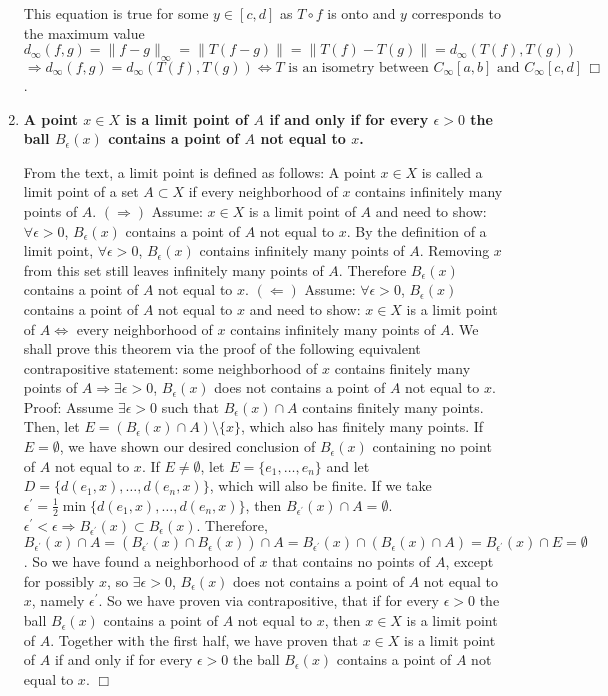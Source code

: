 \documentclass[12pt,letterpaper,reqno]{amsart}
\begin{document}
\begin{enumerate}[1.]
\begin{flushleft}
    This equation is true for some $y \in [c,d]$ as $T\circ f$ is onto and $y$ corresponds to the maximum value
    $$ d_\infty(f,g) = \|f-g\|_\infty = \|T(f-g)\| = \|T(f) - T(g)\| = d_\infty(T(f),T(g)) $$
    $$ \Rightarrow d_\infty(f,g) = d_\infty(T(f),T(g)) \Leftrightarrow T \text{ is an isometry between } C_\infty[a,b] \text{ and } C_\infty[c,d] \, \Box$$. 
\end{flushleft}
\item \textbf{A point $x\in X$ is a limit point of $A$ if and only if for every $\epsilon>0$ the ball $B_\epsilon(x)$ contains a point of $A$ not equal to $x$.}
\begin{flushleft}
    From the text, a limit point is defined as follows:  A point $x \in X$ is called a limit point of a set $A \subset X$ if every neighborhood of $x$ contains infinitely many points of $A$. \newline $(\Rightarrow)$ Assume: $x \in X$ is a limit point of $A$ and need to show: $\forall \epsilon > 0$, $B_\epsilon(x)$ contains a point of $A$ not equal to $x$. By the definition of a limit point, $\forall \epsilon > 0$, $B_\epsilon(x)$ contains infinitely many points of $A$. Removing $x$ from this set still leaves infinitely many points of $A$. Therefore $B_\epsilon(x)$ contains a point of $A$ not equal to $x$.
    \newline $(\Leftarrow)$ Assume: $\forall \epsilon > 0$, $B_\epsilon(x)$ contains a point of $A$ not equal to $x$ and need to show: $x \in X$ is a limit point of $A \Leftrightarrow$ every neighborhood of $x$ contains infinitely many points of $A$. We shall prove this theorem via the proof of the following equivalent contrapositive statement: some neighborhood of $x$ contains finitely many points of $A \Rightarrow \exists \epsilon > 0$, $B_\epsilon(x)$ does not contains a point of $A$ not equal to $x$. Proof: Assume $\exists \epsilon > 0$ such that $B_\epsilon(x) \cap A$ contains finitely many points. Then, let $E = (B_\epsilon(x) \cap A)\setminus \{x\}$, which also has finitely many points. If $E = \emptyset$, we have shown our desired conclusion of $B_\epsilon(x)$ containing no point of $A$ not equal to $x$. If $E \not= \emptyset$, let $E = \{e_1, \ldots, e_n\}$ and let $D = \{d(e_1,x), \ldots, d(e_n, x)\}$, which will also be finite. If we take $\epsilon^\prime = \frac{1}{2} \min\{d(e_1,x), \ldots, d(e_n, x)\}$, then $B_{\epsilon^\prime}(x) \cap A = \emptyset$. $\epsilon^\prime < \epsilon \Rightarrow B_{\epsilon^\prime}(x) \subset B_\epsilon(x)$. Therefore, $B_{\epsilon^\prime}(x) \cap A = (B_{\epsilon^\prime}(x) \cap B_\epsilon(x))\cap A = B_{\epsilon^\prime}(x) \cap (B_\epsilon(x)\cap A) = B_{\epsilon^\prime}(x) \cap E = \emptyset$. So we have found a neighborhood of $x$ that contains no points of $A$, except for possibly $x$, so $\exists \epsilon > 0$, $B_\epsilon(x)$ does not contains a point of $A$ not equal to $x$, namely $\epsilon^\prime$. So we have proven via contrapositive, that if for every $\epsilon>0$ the ball $B_\epsilon(x)$ contains a point of $A$ not equal to $x$, then $x\in X$ is a limit point of $A$. Together with the first half, we have proven that $x\in X$ is a limit point of $A$ if and only if for every $\epsilon>0$ the ball $B_\epsilon(x)$ contains a point of $A$ not equal to $x$. $\Box$

\end{flushleft}
\end{enumerate}
\end{document}
